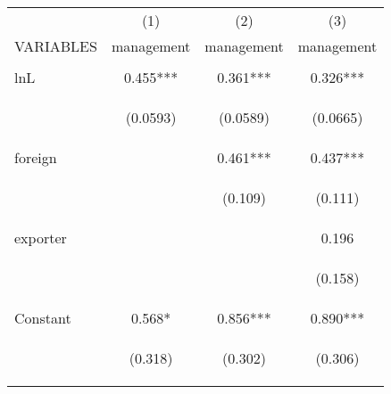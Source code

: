 \begin{center}
\begin{tabular}{lccc} \hline
 & (1) & (2) & (3) \\
VARIABLES & management & management & management \\ \hline
\vspace{4pt} & \begin{footnotesize}\end{footnotesize} & \begin{footnotesize}\end{footnotesize} & \begin{footnotesize}\end{footnotesize} \\
lnL & 0.455*** & 0.361*** & 0.326*** \\
\vspace{4pt} & \begin{footnotesize}(0.0593)\end{footnotesize} & \begin{footnotesize}(0.0589)\end{footnotesize} & \begin{footnotesize}(0.0665)\end{footnotesize} \\
foreign &  & 0.461*** & 0.437*** \\
\vspace{4pt} & \begin{footnotesize}\end{footnotesize} & \begin{footnotesize}(0.109)\end{footnotesize} & \begin{footnotesize}(0.111)\end{footnotesize} \\
exporter &  &  & 0.196 \\
\vspace{4pt} & \begin{footnotesize}\end{footnotesize} & \begin{footnotesize}\end{footnotesize} & \begin{footnotesize}(0.158)\end{footnotesize} \\
Constant & 0.568* & 0.856*** & 0.890*** \\
 & \begin{footnotesize}(0.318)\end{footnotesize} & \begin{footnotesize}(0.302)\end{footnotesize} & \begin{footnotesize}(0.306)\end{footnotesize} \\

\end{tabular}
\end{center}
